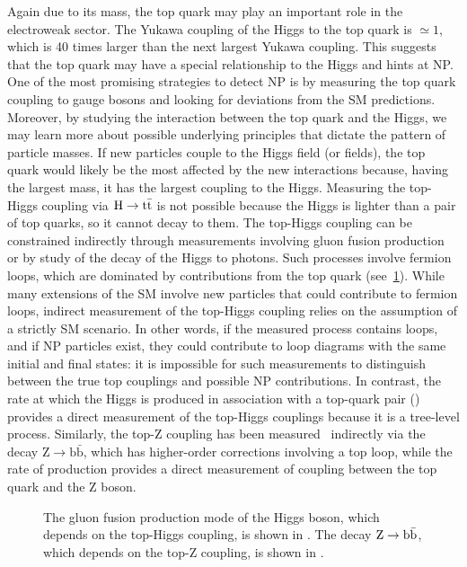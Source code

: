 Again due to its mass, the top quark may play an important role in the
electroweak sector. The Yukawa coupling of the Higgs to the top quark is $\simeq
1$, which is 40 times larger than the next largest Yukawa coupling. This
suggests that the top quark may have a special relationship to the Higgs and
hints at NP. One of the most promising strategies to detect NP is by measuring
the top quark coupling to gauge bosons and looking for deviations from the SM
predictions. Moreover, by studying the interaction between the top quark and the
Higgs, we may learn more about possible underlying principles that dictate the
pattern of particle masses. If new particles couple to the Higgs field (or
fields), the top quark would likely be the most affected by the new interactions
because, having the largest mass, it has the largest coupling to the Higgs.
Measuring the top-Higgs coupling via $\text{H} \rightarrow
\text{t}\bar{\text{t}}$ is not possible because the Higgs is lighter than a
pair of top quarks, so it cannot decay to them. The top-Higgs coupling can be
constrained indirectly through measurements involving gluon fusion
production~\cite{Khachatryan:1979247} or by study of the decay of the Higgs to
photons. Such processes involve fermion loops, which are dominated by
contributions from the top quark (see~\cref{fig:loops}). While many extensions
of the SM involve new particles that could contribute to fermion loops, indirect
measurement of the top-Higgs coupling relies on the assumption of a strictly SM
scenario. In other words, if the measured process contains loops, and if NP
particles exist, they could contribute to loop diagrams with the same initial
and final states: it is impossible for such measurements to distinguish between
the true top couplings and possible NP contributions. In contrast, the rate at
which the Higgs is produced in association with a top-quark pair (\ttH) provides
a direct measurement of the top-Higgs couplings because it is a tree-level
process. Similarly, the top-Z coupling has been
measured~\cite{0034-4885-62-9-201} indirectly via the decay $\text{Z}
\rightarrow \text{b}\bar{\text{b}}$, which has higher-order corrections
involving a top loop, while the rate of \ttZ production provides a direct
measurement of coupling between the top quark and the Z boson.

\begin{figure}[tb]
  
  \caption[One-loop diagrams with top-Higgs or top-Z couplings]{
    The gluon fusion production mode of the Higgs boson, which depends on the
    top-Higgs coupling, is shown in . The decay $\text{Z}
    \rightarrow \text{b}\bar{\text{b}}$, which depends on the top-Z coupling, is shown in
    .
  }
  \label{fig:loops}
\end{figure}

